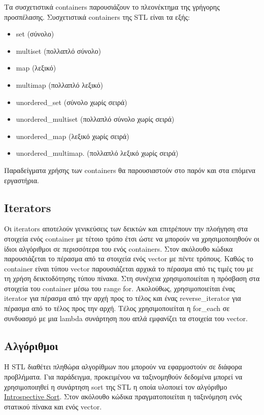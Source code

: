 Τα συσχετιστικά containers παρουσιάζουν το πλεονέκτημα της γρήγορης προσπέλασης. Συσχετιστικά containers της STL είναι τα εξής: 
\begin{itemize}[noitemsep]
\item set (σύνολο)
\item multiset (πολλαπλό σύνολο)
\item map (λεξικό)
\item multimap (πολλαπλό λεξικό)
\item unordered\_set (σύνολο χωρίς σειρά)
\item unordered\_multiset (πολλαπλό σύνολο χωρίς σειρά)
\item unordered\_map (λεξικό χωρίς σειρά)
\item unordered\_multimap. (πολλαπλό λεξικό χωρίς σειρά)
\end{itemize}

Παραδείγματα χρήσης των containers θα παρουσιαστούν στο παρόν και στα επόμενα εργαστήρια.

\subsection{Iterators}
Οι iterators αποτελούν γενικεύσεις των δεικτών και επιτρέπουν την πλοήγηση στα στοιχεία ενός container με τέτοιο τρόπο έτσι ώστε να μπορούν να χρησιμοποιηθούν οι ίδιοι αλγόριθμοι σε περισσότερα του ενός containers. Στον ακόλουθο κώδικα παρουσιάζεται το πέρασμα από τα στοιχεία ενός vector με πέντε τρόπους. Καθώς το container είναι τύπου vector παρουσιάζεται αρχικά το πέρασμα από τις τιμές του με τη χρήση δεικτοδότησης τύπου πίνακα. Στη συνέχεια χρησιμοποιείται η πρόσβαση στα στοιχεία του container μέσω του range for. Ακολούθως, χρησιμοποιείται ένας iterator για πέρασμα από την αρχή προς το τέλος και ένας reverse\_iterator για πέρασμα από το τέλος προς την αρχή. Τέλος χρησιμοποιείται η for\_each σε συνδυασμό με μια lambda συνάρτηση που απλά εμφανίζει τα στοιχεία του vector.





\subsection{Αλγόριθμοι}
H STL διαθέτει πληθώρα αλγορίθμων που μπορούν να εφαρμοστούν σε διάφορα προβλήματα. Για παράδειγμα, προκειμένου να ταξινομηθούν δεδομένα μπορεί να χρησιμοποιηθεί η συνάρτηση sort της STL η οποία υλοποιεί τον αλγόριθμο \href{https://xlinux.nist.gov/dads/HTML/introspectiveSort.html}{Introspective Sort}. Στον ακόλουθο κώδικα πραγματοποιείται η ταξινόμηση ενός στατικού πίνακα και ενός vector.

